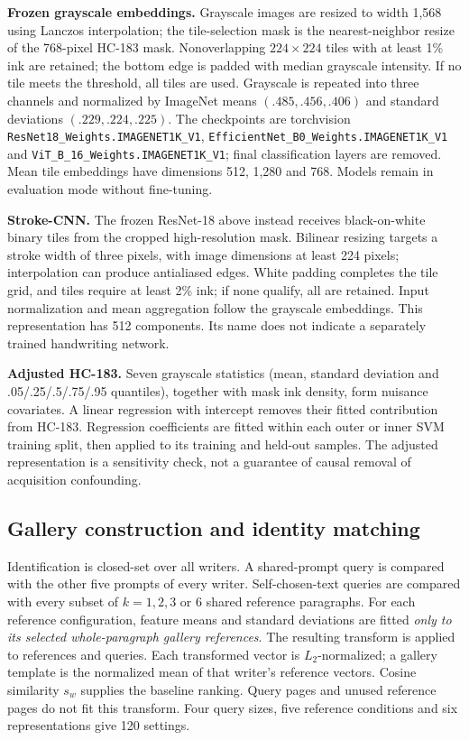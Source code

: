 \textbf{Frozen grayscale embeddings.} Grayscale images are resized to width 1,568 using Lanczos interpolation; the tile-selection mask is the nearest-neighbor resize of the 768-pixel HC-183 mask. Nonoverlapping $224\times224$ tiles with at least 1\% ink are retained; the bottom edge is padded with median grayscale intensity. If no tile meets the threshold, all tiles are used. Grayscale is repeated into three channels and normalized by ImageNet means $(.485,.456,.406)$ and standard deviations $(.229,.224,.225)$. The checkpoints are torchvision \texttt{ResNet18\_Weights.IMAGENET1K\_V1}, \texttt{EfficientNet\_B0\_Weights.IMAGENET1K\_V1} and \texttt{ViT\_B\_16\_Weights.IMAGENET1K\_V1}; final classification layers are removed. Mean tile embeddings have dimensions 512, 1,280 and 768. Models remain in evaluation mode without fine-tuning.

\textbf{Stroke-CNN.} The frozen ResNet-18 above instead receives black-on-white binary tiles from the cropped high-resolution mask. Bilinear resizing targets a stroke width of three pixels, with image dimensions at least 224 pixels; interpolation can produce antialiased edges. White padding completes the tile grid, and tiles require at least 2\% ink; if none qualify, all are retained. Input normalization and mean aggregation follow the grayscale embeddings. This representation has 512 components. Its name does not indicate a separately trained handwriting network.

\textbf{Adjusted HC-183.} Seven grayscale statistics (mean, standard deviation and .05/.25/.5/.75/.95 quantiles), together with mask ink density, form nuisance covariates. A linear regression with intercept removes their fitted contribution from HC-183. Regression coefficients are fitted within each outer or inner SVM training split, then applied to its training and held-out samples. The adjusted representation is a sensitivity check, not a guarantee of causal removal of acquisition confounding.

\subsection{Gallery construction and identity matching}

Identification is closed-set over all writers. A shared-prompt query is compared with the other five prompts of every writer. Self-chosen-text queries are compared with every subset of $k=1,2,3$ or 6 shared reference paragraphs. For each reference configuration, feature means and standard deviations are fitted \emph{only to its selected whole-paragraph gallery references}. The resulting transform is applied to references and queries. Each transformed vector is $L_2$-normalized; a gallery template is the normalized mean of that writer's reference vectors. Cosine similarity $s_w$ supplies the baseline ranking. Query pages and unused reference pages do not fit this transform. Four query sizes, five reference conditions and six representations give 120 settings.


